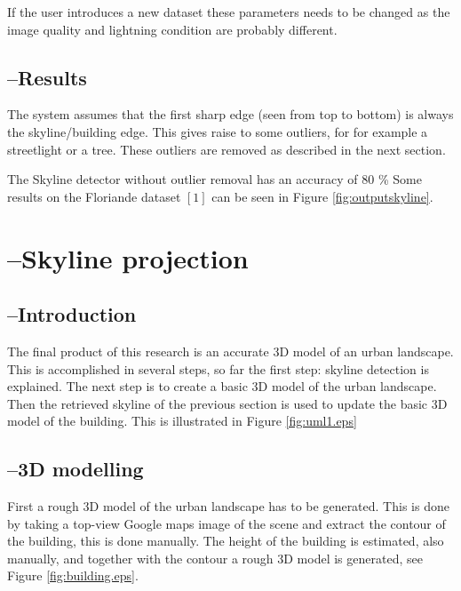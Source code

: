 If the user introduces a new dataset these parameters needs to be changed
as the image quality and lightning condition are probably different.

 \subsection{--Results}%
The system assumes that the first sharp edge (seen from top to bottom) is
always the skyline/building edge. This gives raise to some outliers, for 
for example a streetlight or a tree. These outliers are removed as described in
the next section.  

The Skyline detector without outlier removal has an accuracy of 80 \% 
Some results on the Floriande dataset $[1]$ can be seen in Figure \ref{fig:outputskyline}.



\section{--Skyline projection}
 \subsection{--Introduction}
The final product of this research is an accurate 3D model of an urban
landscape. This is accomplished in several steps, so far the first step: skyline detection is
explained. The next step is to create a basic 3D model of the urban landscape.
Then the retrieved skyline of the previous section is used to update the basic
3D model of the building. This is illustrated in Figure \ref{fig:uml1.eps}




   \subsection{--3D modelling}
First a rough 3D model of the urban landscape has to be generated. This is done
by taking a top-view Google maps image of the scene and extract the contour of
the building, this is done manually. 
The height of the building is estimated, also manually, and together with the
contour a rough 3D model is generated, see Figure \ref{fig:building.eps}. 



